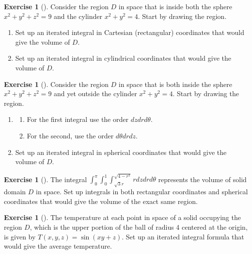 \documentclass[10pt,]{book}
\theoremstyle{plain}
\theoremstyle{definition}
\theoremstyle{definition}
\theoremstyle{definition}
\theoremstyle{definition}
\newtheorem{exploration}[project]{Exercise}
\theoremstyle{definition}
\numberwithin{equation}{section}
\newcommand{\ds}{\displaystyle}
\begin{document}
\begin{exploration}[]\label{exploration-304}
Consider the region \(D\) in space that is inside both the sphere \(x^2+y^2+z^2=9\) and the cylinder \(x^2+y^2=4\).%
Start by drawing the region.%
\begin{enumerate}[font=\bfseries,label=(\alph*),ref=\alph*]
\item\label{task-841} Set up an iterated integral in Cartesian (rectangular) coordinates that would give the volume of \(D\).%
\item\label{task-842} Set up an iterated integral in cylindrical coordinates that would give the volume of \(D\).%
\end{enumerate}
\end{exploration}
\begin{exploration}[]\label{exploration-305}
Consider the region \(D\) in space that is both inside the sphere \(x^2+y^2+z^2=9\) and yet outside the cylinder \(x^2+y^2=4\).%
Start by drawing the region.%
\begin{enumerate}[font=\bfseries,label=(\alph*),ref=\alph*]
\item\label{task-843} \begin{enumerate}[font=\bfseries,label=(\roman*),ref=\theenumi.\roman*]
\item\label{task-844} For the first integral use the order \(dzdrd\theta\).%
\item\label{task-845} For the second, use the order \(d\theta dr dz\).%
\end{enumerate}
\item\label{task-846} Set up an iterated integral in spherical coordinates that would give the volume of \(D\).%
\end{enumerate}
\end{exploration}
\begin{exploration}[]\label{exploration-306}
The integral \(\ds\int_{0}^{\pi}\int_{0}^{1}\int_{\sqrt{3}r}^{\sqrt{4-r^2}}rdzdrd\theta\) represents the volume of solid domain \(D\) in space. Set up integrals in both rectangular coordinates and spherical coordinates that would give the volume of the exact same region.%
\end{exploration}
\begin{exploration}[]\label{exploration-307}
The temperature at each point in space of a solid occupying the region {\(D\)}, which is the upper portion of the ball of radius 4 centered at the origin, is given by \(T(x,y,z) = \sin(xy+z)\). Set up an iterated integral formula that would give the average temperature.%
\end{exploration}
\typeout{************************************************}
\typeout{************************************************}
\end{document}
